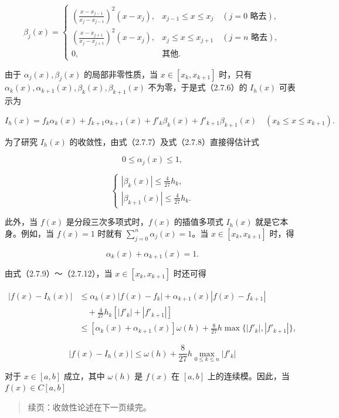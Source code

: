 \documentclass[
  10pt,
  fontset=fandol]{ctexart}
\begin{document}
\[\beta_j(x)=\begin{cases}
\displaystyle\left(\frac{x-x_{j-1}}{x_j-x_{j-1}}\right)^2(x-x_j),&x_{j-1}\leqslant x\leqslant x_j\quad(j=0\text{ 略去}),\\[6pt]
\displaystyle\left(\frac{x-x_{j+1}}{x_j-x_{j+1}}\right)^2(x-x_j),&x_j\leqslant x\leqslant x_{j+1}\quad(j=n\text{ 略去}),\\[6pt]
0,&\text{其他}.
\end{cases}\tag{2.7.8}\]

由于 \(\alpha_j(x),\beta_j(x)\) 的局部非零性质，当 \(x\in[x_k,x_{k+1}]\) 时，只有 \(\alpha_k(x),\alpha_{k+1}(x),\beta_k(x),\beta_{k+1}(x)\) 不为零，于是式（2.7.6）的 \(I_h(x)\) 可表示为

\[I_h(x)=f_k\alpha_k(x)+f_{k+1}\alpha_{k+1}(x)+f'_k\beta_k(x)+f'_{k+1}\beta_{k+1}(x)\quad(x_k\leqslant x\leqslant x_{k+1}).\tag{2.7.9}\]

为了研究 \(I_h(x)\) 的收敛性，由式（2.7.7）及式（2.7.8）直接得估计式

\[0\leqslant\alpha_j(x)\leqslant1,\tag{2.7.10}\]

\[\begin{cases}
\displaystyle|\beta_k(x)|\leqslant\frac{4}{27}h_k,\\[6pt]
\displaystyle|\beta_{k+1}(x)|\leqslant\frac{4}{27}h_k.
\end{cases}\tag{2.7.11}\]

此外，当 \(f(x)\) 是分段三次多项式时，\(f(x)\) 的插值多项式 \(I_h(x)\) 就是它本身。例如，当 \(f(x)=1\) 时就有 \(\sum_{j=0}^n\alpha_j(x)=1\)。当 \(x\in[x_k,x_{k+1}]\) 时，得

\[\alpha_k(x)+\alpha_{k+1}(x)=1.\tag{2.7.12}\]

由式（2.7.9）～（2.7.12），当 \(x\in[x_k,x_{k+1}]\) 时还可得

\[\begin{aligned}
|f(x)-I_h(x)|&\leqslant\alpha_k(x)|f(x)-f_k|+\alpha_{k+1}(x)|f(x)-f_{k+1}|\\
&\quad+\frac{4}{27}h_k[|f'_k|+|f'_{k+1}|]\\
&\leqslant[\alpha_k(x)+\alpha_{k+1}(x)]\omega(h)+\frac{8}{27}h\max\{|f'_k|,|f'_{k+1}|\},
\end{aligned}\]

\[|f(x)-I_h(x)|\leqslant\omega(h)+\frac{8}{27}h\max_{0\leqslant k\leqslant n}|f'_k|\tag{2.7.13}\]

对于 \(x\in[a,b]\) 成立，其中 \(\omega(h)\) 是 \(f(x)\) 在 \([a,b]\) 上的连续模。因此，当 \(f(x)\in C[a,b]\)

\begin{quote}
续页：收敛性论述在下一页续完。
\end{quote}
\end{document}
